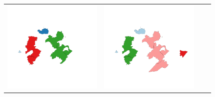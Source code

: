 \begin{figure}
\begin{tabularx}{1\textwidth}{XXXX}
\includegraphics[width=1\linewidth]{images/ch6/contig/05}&
\includegraphics[width=1\linewidth]{images/ch6/contig/06}&

\end{tabularx}
\end{figure}

